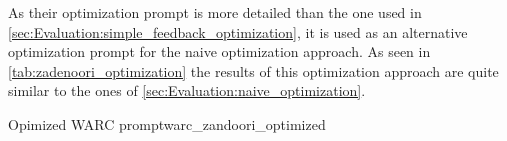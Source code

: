 As their optimization prompt is more detailed than the one used in \autoref{sec:Evaluation:simple_feedback_optimization}, it is used as an alternative optimization prompt for the naive optimization approach.
As seen in \autoref{tab:zadenoori_optimization} the results of this optimization approach are quite similar to the ones of \autoref{sec:Evaluation:naive_optimization}.

\newpage
\begin{prompt}{Opimized WARC prompt}{warc_zandoori_optimized}
    
\end{prompt}
\newpage
\begin{table}
    \centering
    \renewcommand{\arraystretch}{1.4}
    
    \renewcommand{\arraystretch}{1}
    \caption{Naive prompt optimization approach using the optimization prompt by }
    \label{tab:zadenoori_optimization}
\end{table}